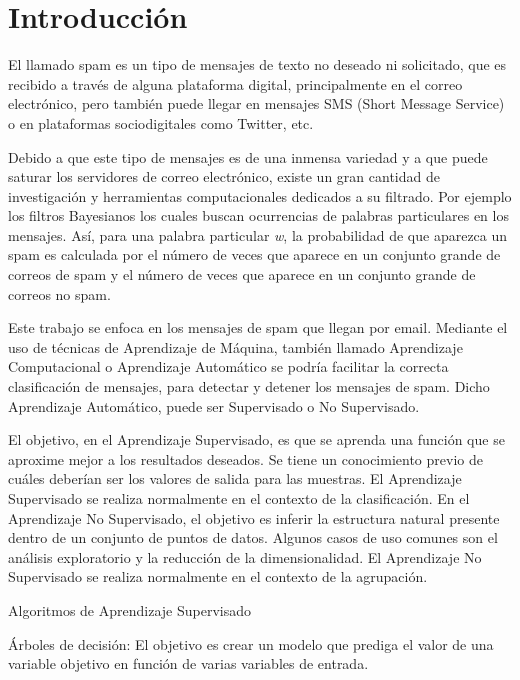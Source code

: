 \thispagestyle{empty}
\chapter*{Introducción}
El llamado  spam es un tipo de mensajes de texto no deseado ni solicitado, que es recibido a través de alguna plataforma digital, principalmente en el correo electrónico, pero también  puede llegar en mensajes SMS (Short Message Service) o en plataformas sociodigitales como Twitter, etc.

Debido a que este tipo de mensajes es de una inmensa variedad y a que puede saturar los servidores de correo electrónico, existe un gran cantidad de investigación y herramientas computacionales dedicados a su filtrado.  Por ejemplo los filtros Bayesianos los cuales buscan ocurrencias de palabras particulares en los mensajes. Así, para una palabra particular \textit{w}, la probabilidad de que aparezca un  spam es calculada por el número de veces que aparece en un conjunto grande de correos de  spam y el número de veces que aparece en un conjunto grande de correos no spam.

Este trabajo se enfoca en los mensajes de  spam que llegan por email. Mediante el uso de técnicas de Aprendizaje de Máquina, también llamado Aprendizaje Computacional o Aprendizaje Automático se podría facilitar la correcta clasificación de mensajes, para detectar y detener los mensajes de spam. Dicho Aprendizaje Automático, puede ser Supervisado o No Supervisado.

El objetivo, en el Aprendizaje Supervisado, es que se aprenda una función que se aproxime mejor a los resultados deseados. Se tiene un conocimiento previo de cuáles deberían ser los valores de salida para las muestras. El Aprendizaje Supervisado se realiza normalmente en el contexto de la clasificación.
En el Aprendizaje No Supervisado, el objetivo es inferir la estructura natural presente  dentro de un conjunto de puntos de datos. Algunos casos de uso comunes son el análisis exploratorio y la reducción de la dimensionalidad. El Aprendizaje No Supervisado se realiza normalmente en el contexto de la agrupación.


Algoritmos de Aprendizaje Supervisado

Árboles de decisión: El objetivo es crear un modelo que prediga el valor de una variable objetivo en función de varias variables de entrada.

